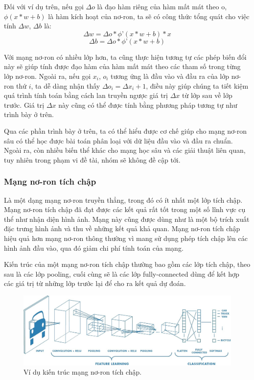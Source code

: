 \documentclass[a4paper,14pt]{extreport}
\begin{document}
Đối với ví dụ trên, nếu gọi $\Delta o$ là đạo hàm riêng của hàm mất mát theo o, $\phi(x*w + b)$ là hàm kích hoạt của nơ-ron, ta sẽ có 
công thức tổng quát cho việc tính  $\Delta w$,  $\Delta b$ là:
\[ \Delta w =  \Delta o * \phi ’(x*w + b) * x \]
\[ \Delta b =  \Delta o * \phi ’(x*w + b) \]

Với mạng nơ-ron có nhiều lớp hơn, ta cũng thực hiện tương tự các phép biến đổi này sẽ giúp tính được 
đạo hàm của hàm mất mát theo các tham số trong từng lớp nơ-ron. Ngoài ra, nếu gọi $x_i$, $o_i$ tương 
ứng là đầu vào và đầu ra của lớp nơ-ron thứ $i$, ta dễ dàng nhận thấy $\Delta o_i = \Delta x_i+1$, 
điều này giúp chúng ta tiết kiệm quá trình tính toán bằng cách lan truyền ngược giá trị $\Delta x$ 
từ lớp sau về lớp trước. Giá trị $\Delta x$ này cũng có thể được tính bằng phương pháp tương tự như 
trình bày ở trên.

Qua các phần trình bày ở trên, ta có thể hiểu được cơ chế giúp cho mạng nơ-ron sâu có thể học được 
bài toán phân loại với dữ liệu đầu vào và đầu ra chuẩn. Ngoài ra, còn nhiều biến thể khác cho mạng 
học sâu và các giải thuật liên quan, tuy nhiên trong phạm vi đề tài, nhóm sẽ không đề cập tới.

\subsubsection*{ Mạng nơ-ron tích chập }
Là một dạng mạng nơ-ron truyền thẳng, trong đó có ít nhất một lớp tích chập. Mạng nơ-ron tích chập đã 
đạt được các kết quả rất tốt trong một số lĩnh vực cụ thể như nhận diện hình ảnh. Mạng này cũng được 
dùng như là một bộ trích xuất đặc trưng hình ảnh và thu về những kết quả khả quan. Mạng nơ-ron tích chập 
hiệu quả hơn mạng nơ-ron thông thường vì mang sử dụng phép tích chập lên các hình ảnh đầu vào, qua đó giảm 
chi phí tính toán của mạng.
\par
Kiến trúc của một mạng nơ-ron tích chập thường bao gồm các lớp tích chập, theo sau là các lớp pooling,
 cuối cùng sẽ là các lớp fully-connected dùng để kết hợp các giá trị từ những lớp trước lại để cho ra 
kết quả dự đoán.

\begin{figure}  
    \centering
    \includegraphics[scale=0.3]{img/cnn-architect.jpeg}
    \caption{Ví dụ kiến trúc mạng nơ-ron tích chập.}
\end{figure}    
\end{document}
